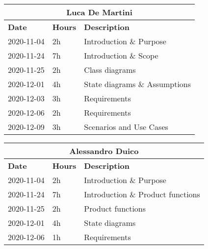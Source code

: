 
\begin{table}[H]
    \centering
    \begin{tabular}{|l|l|l|}
        \multicolumn{3}{c}{\textbf{Luca De Martini}}\\
        \hline
        \textbf{Date} & \textbf{Hours} & \textbf{Description}    \\\hline
        2020-11-04    & 2h             & Introduction \& Purpose \\\hline
        2020-11-24    & 7h             & Introduction \& Scope \\\hline
        2020-11-25    & 2h             & Class diagrams \\\hline
        2020-12-01    & 4h             & State diagrams \& Assumptions \\\hline
        2020-12-03    & 3h             & Requirements \\\hline
        2020-12-06    & 2h             & Requirements \\\hline
        2020-12-09    & 3h             & Scenarios and Use Cases\\\hline
    \end{tabular}
\end{table}
\begin{table}[H]
    \centering
    \begin{tabular}{|l|l|l|}
        \multicolumn{3}{c}{\textbf{Alessandro Duico}}\\
        \hline
        \textbf{Date} & \textbf{Hours} & \textbf{Description}    \\\hline
        2020-11-04    & 2h             & Introduction \& Purpose \\\hline
        2020-11-24    & 7h             & Introduction \& Product functions \\\hline
        2020-11-25    & 2h             & Product functions \\\hline
        2020-12-01    & 4h             & State diagrams \\\hline
        2020-12-06    & 1h             & Requirements \\\hline
    \end{tabular}
\end{table}